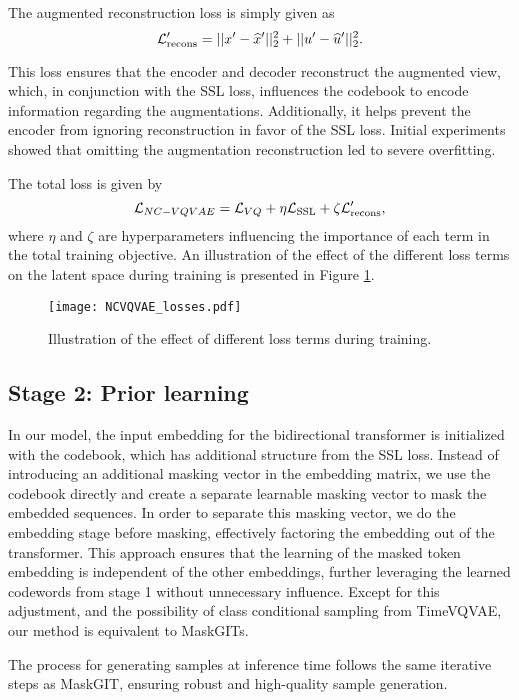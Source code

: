 \documentclass[../../thesis.tex]{subfiles}
\begin{document}
The augmented reconstruction loss is simply given as 
\begin{equation}
    \label{eq:NCVQVAE_augrecons}
        \mathcal{L}_\text{recons}' = ||x' - \widehat{x}' ||_2^2 + ||u' - \widehat{u}'||_2^2.
\end{equation}

This loss ensures that the encoder and decoder reconstruct the augmented view, which, in conjunction with the SSL loss, influences the codebook to encode information regarding the augmentations. Additionally, it helps prevent the encoder from ignoring reconstruction in favor of the SSL loss. Initial experiments showed that omitting the augmentation reconstruction led to severe overfitting.\newline

The total loss is given by 
\begin{equation}
    \mathcal{L}_{NC-VQVAE} = \mathcal{L}_{VQ} + \eta\mathcal{L}_{\text{SSL}} + \zeta \mathcal{L}_\text{recons}',
\end{equation}
where $\eta$ and $\zeta$ are hyperparameters influencing the importance of each term in the total training objective. An illustration of the effect of the different loss terms on the latent space during training is presented in Figure \ref{fig:NCVQVAE_losses}. 

\begin{figure}
    \centering
    \texttt{[image: NCVQVAE\_losses.pdf]}
    \caption{Illustration of the effect of different loss terms during training.}
    \label{fig:NCVQVAE_losses}
\end{figure}

\subsection{Stage 2: Prior learning}

In our model, the input embedding for the bidirectional transformer is initialized with the codebook, which has additional structure from the SSL loss. Instead of introducing an additional masking vector in the embedding matrix, we use the codebook directly and create a separate learnable masking vector to mask the embedded sequences. In order to separate this masking vector, we do the embedding stage before masking, effectively factoring the embedding out of the transformer. This approach ensures that the learning of the masked token embedding is independent of the other embeddings, further leveraging the learned codewords from stage 1 without unnecessary influence. Except for this adjustment, and the possibility of class conditional sampling from TimeVQVAE, our method is equivalent to MaskGITs.
\newline

The process for generating samples at inference time follows the same iterative steps as MaskGIT, ensuring robust and high-quality sample generation.
\end{document}
